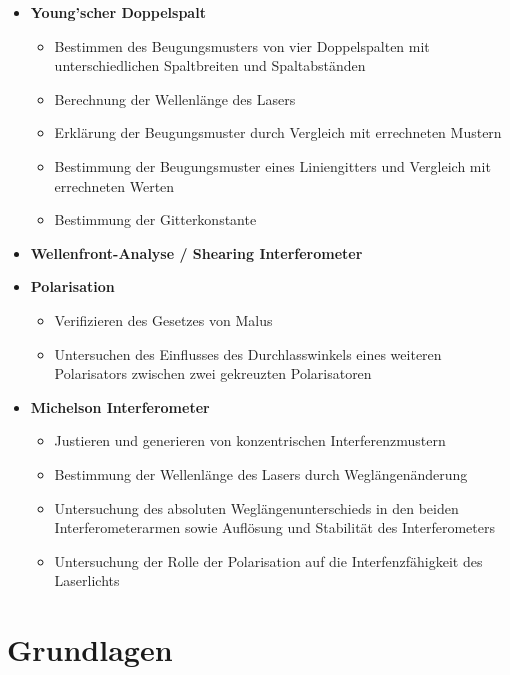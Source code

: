 \documentclass[ngerman]{scrartcl}
\begin{document}
\begin{itemize}
    \item \textbf{Young'scher Doppelspalt}
          \begin{itemize}
              \item Bestimmen des Beugungsmusters von vier Doppelspalten mit unterschiedlichen Spaltbreiten und Spaltabständen
              \item Berechnung der Wellenlänge des Lasers
              \item Erklärung der Beugungsmuster durch Vergleich mit errechneten Mustern
              \item Bestimmung der Beugungsmuster eines Liniengitters und Vergleich mit errechneten Werten
              \item Bestimmung der Gitterkonstante
          \end{itemize}
    \item \textbf{Wellenfront-Analyse / Shearing Interferometer}
    \item \textbf{Polarisation}
          \begin{itemize}
              \item Verifizieren des Gesetzes von Malus
              \item Untersuchen des Einflusses des Durchlasswinkels eines weiteren Polarisators zwischen zwei gekreuzten Polarisatoren
          \end{itemize}
    \item \textbf{Michelson Interferometer}
          \begin{itemize}
              \item Justieren und generieren von konzentrischen Interferenzmustern
              \item Bestimmung der Wellenlänge des Lasers durch Weglängenänderung
              \item Untersuchung des absoluten Weglängenunterschieds in den beiden Interferometerarmen sowie Auflösung und Stabilität des Interferometers
              \item Untersuchung der Rolle der Polarisation auf die Interfenzfähigkeit des Laserlichts
          \end{itemize}
\end{itemize}


\section[Grundlagen]{Grundlagen \cite{ref:angabe}}
\label{sec:grundlagen}
\end{document}
